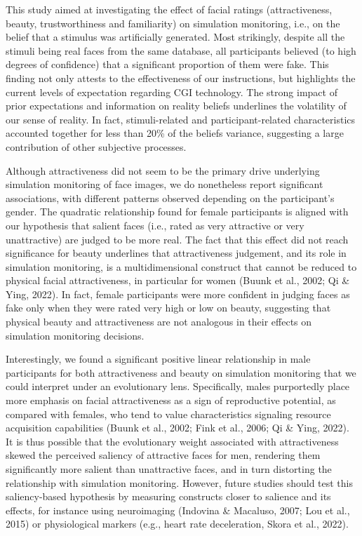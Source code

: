 \documentclass[
  man,
  floatsintext,
  longtable,
  nolmodern,
  notxfonts,
  notimes,
  colorlinks=true,linkcolor=blue,citecolor=blue,urlcolor=blue]{apa7}
\begin{document}
This study aimed at investigating the effect of facial ratings
(attractiveness, beauty, trustworthiness and familiarity) on simulation
monitoring, i.e., on the belief that a stimulus was artificially
generated. Most strikingly, despite all the stimuli being real faces
from the same database, all participants believed (to high degrees of
confidence) that a significant proportion of them were fake. This
finding not only attests to the effectiveness of our instructions, but
highlights the current levels of expectation regarding CGI technology.
The strong impact of prior expectations and information on reality
beliefs underlines the volatility of our sense of reality. In fact,
stimuli-related and participant-related characteristics accounted
together for less than 20\% of the beliefs variance, suggesting a large
contribution of other subjective processes.

Although attractiveness did not seem to be the primary drive underlying
simulation monitoring of face images, we do nonetheless report
significant associations, with different patterns observed depending on
the participant's gender. The quadratic relationship found for female
participants is aligned with our hypothesis that salient faces (i.e.,
rated as very attractive or very unattractive) are judged to be more
real. The fact that this effect did not reach significance for beauty
underlines that attractiveness judgement, and its role in simulation
monitoring, is a multidimensional construct that cannot be reduced to
physical facial attractiveness, in particular for women (Buunk et al.,
2002; Qi \& Ying, 2022). In fact, female participants were more
confident in judging faces as fake only when they were rated very high
or low on beauty, suggesting that physical beauty and attractiveness are
not analogous in their effects on simulation monitoring decisions.

Interestingly, we found a significant positive linear relationship in
male participants for both attractiveness and beauty on simulation
monitoring that we could interpret under an evolutionary lens.
Specifically, males purportedly place more emphasis on facial
attractiveness as a sign of reproductive potential, as compared with
females, who tend to value characteristics signaling resource
acquisition capabilities (Buunk et al., 2002; Fink et al., 2006; Qi \&
Ying, 2022). It is thus possible that the evolutionary weight associated
with attractiveness skewed the perceived saliency of attractive faces
for men, rendering them significantly more salient than unattractive
faces, and in turn distorting the relationship with simulation
monitoring. However, future studies should test this saliency-based
hypothesis by measuring constructs closer to salience and its effects,
for instance using neuroimaging (Indovina \& Macaluso, 2007; Lou et al.,
2015) or physiological markers (e.g., heart rate deceleration, Skora et
al., 2022).
\end{document}
